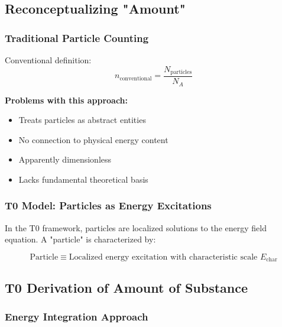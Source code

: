 \documentclass[12pt,a4paper]{article}
\newcommand{\Echar}{E_{\text{char}}}
\begin{document}
	\subsection{Reconceptualizing "Amount"}
	\label{subsec:reconceptualizing_amount}
	
	\subsubsection{Traditional Particle Counting}
	\label{subsubsec:traditional_counting}
	
	Conventional definition:
	\begin{equation}
		n_{\text{conventional}} = \frac{N_{\text{particles}}}{N_A}
		\label{eq:conventional_mol}
	\end{equation}
	
	\textbf{Problems with this approach:}
	\begin{itemize}
		\item Treats particles as abstract entities
		\item No connection to physical energy content
		\item Apparently dimensionless
		\item Lacks fundamental theoretical basis
	\end{itemize}
	
	\subsubsection{T0 Model: Particles as Energy Excitations}
	\label{subsubsec:t0_particles_energy}
	
	In the T0 framework, particles are localized solutions to the energy field equation. A "particle" is characterized by:
	
	\begin{equation}
		\text{Particle} \equiv \text{Localized energy excitation with characteristic scale } \Echar
		\label{eq:t0_particle_definition}
	\end{equation}
	
	\subsection{T0 Derivation of Amount of Substance}
	\label{subsec:t0_mol_derivation}
	
	\subsubsection{Energy Integration Approach}
	\label{subsubsec:energy_integration}
	
\end{document}
